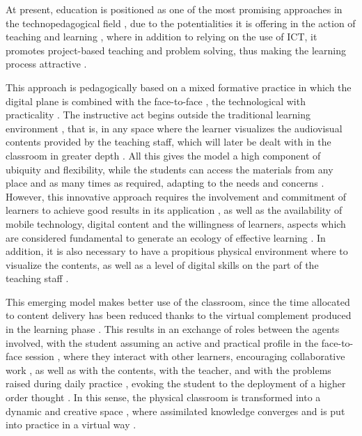\documentclass{textolivre}
\begin{document}
At present, education is positioned as one of the most promising approaches in the technopedagogical field \cite{hinojo_lucena_influencia_2019}, due to the potentialities it is offering in the action of teaching and learning \cite{he_effects_2016}, where in addition to relying on the use of ICT, it promotes project-based teaching and problem solving, thus making the learning process attractive \cite{kostaris_investigating_2017}.

This approach is pedagogically based on a mixed formative practice in which the digital plane is combined with the face-to-face \cite{lee_development_2017}, the technological with practicality \cite{froehlich_non-technological_2018}. The instructive act begins outside the traditional learning environment \cite{borao_moreno_alisis_2016}, that is, in any space where the learner visualizes the audiovisual contents provided by the teaching staff, which will later be dealt with in the classroom in greater depth \cite{el_miedany_flipped_2019,long_use_2017}. All this gives the model a high component of ubiquity and flexibility, while the students can access the materials from any place and as many times as required, adapting to the needs and concerns \cite{blau_re-designed_2017, boelens_design_2018,pereira_young_2019}. However, this innovative approach requires the involvement and commitment of learners to achieve good results in its application \cite{touron_modelo_2015}, as well as the availability of mobile technology, digital content and the willingness of learners, aspects which are considered fundamental to generate an ecology of effective learning \cite{hinojo-lucena_incidence_2018}. In addition, it is also necessary to have a propitious physical environment where to visualize the contents, as well as a level of digital skills on the part of the teaching staff \cite{lopez2019}.

This emerging model makes better use of the classroom, since the time allocated to content delivery has been reduced thanks to the virtual complement produced in the learning phase \cite{bauer-ramazani_flipped_2016}. This results in an exchange of roles between the agents involved, with the student assuming an active and practical profile in the face-to-face session \cite{ahmed_flipped_2016,mortensen_flipped_2015}, where they interact with other learners, encouraging collaborative work \cite{macleod_technological_2018}, as well as  with the contents, with the teacher, and with the problems raised during daily practice \cite{castellanos_sanchez_nuevos_2017,hwang_seamless_2015}, evoking the student to the deployment of a higher order thought \cite{university_of_otago_wellington_new_zealand_just_2017}. In this sense, the physical classroom is transformed into a dynamic and creative space \cite{nouri_flipped_2016}, where assimilated knowledge converges and is put into practice in a virtual way \cite{abeysekera_motivation_2015}.
\end{document}
